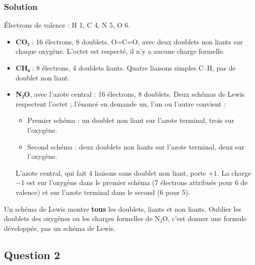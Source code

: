 \documentclass[11pt,a4paper]{article}
\providecommand{\tightlist}{\setlength{\itemsep}{0pt}\setlength{\parskip}{0pt}}
\newcommand{\equationajustee}[1]{%
  \sbox{\boiteequation}{$\displaystyle #1$}%
  \ifdim\wd\boiteequation>\linewidth
    \[\resizebox{\linewidth}{!}{\usebox{\boiteequation}}\]%
  \else
    \[#1\]%
  \fi}
\begin{document}
\hypertarget{solution}{%
\subsubsection{Solution}\label{solution}}

Électrons de valence : H 1, C 4, N 5, O 6.

\begin{itemize}
\tightlist
\item
  \textbf{CO₂} : 16 électrons, 8 doublets. O=C=O, avec deux doublets non liants sur chaque oxygène. L'octet est respecté, il n'y a aucune charge formelle.
\item
  \textbf{CH₄} : 8 électrons, 4 doublets liants. Quatre liaisons simples C--H, pas de doublet non liant.
\item
  \textbf{N₂O}, avec l'azote central : 16 électrons, 8 doublets. Deux schémas de Lewis respectent l'octet ; l'énoncé en demande un, l'un ou l'autre convient :
  \equationajustee{\begin{aligned}{}&\text{N}\equiv\overset{\oplus}{\text{N}}-\overset{\ominus}{\text{O}}\\
  \text{ou}\quad&\overset{\ominus}{\text{N}}=\overset{\oplus}{\text{N}}=\text{O}
  \end{aligned}}

  \begin{itemize}
  \tightlist
  \item
    Premier schéma : un doublet non liant sur l'azote terminal, trois sur l'oxygène.
  \item
    Second schéma : deux doublets non liants sur l'azote terminal, deux sur l'oxygène.
  \end{itemize}

  L'azote central, qui fait 4 liaisons sans doublet non liant, porte \(+1\). La charge \(-1\) est sur l'oxygène dans le premier schéma (7 électrons attribués pour 6 de valence) et sur l'azote terminal dans le second (6 pour 5).
\end{itemize}

\begin{piege}

Un schéma de Lewis montre \textbf{tous} les doublets, liants et non liants. Oublier les doublets des oxygènes ou les charges formelles de N₂O, c'est donner une formule développée, pas un schéma de Lewis.

\end{piege}

\hypertarget{question-2}{%
\subsection{Question 2}\label{question-2}}
\end{document}
